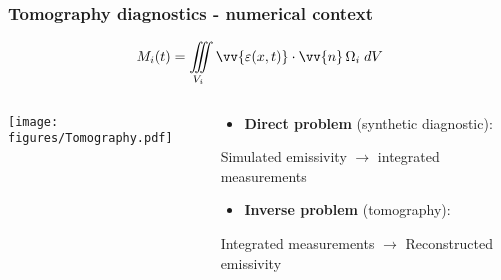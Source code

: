 \documentclass[10pt]{beamer}
\begin{document}
\begin{frame}
\frametitle{Tomography diagnostics - numerical context}
    \vspace{-0.75cm}

    $$M_i(t) = \iiint\limits_{V_i} \vv{\varepsilon(x,t)}\cdot\vv{n} \,\Omega_i \;{d}V$$
    \vspace{-0.75cm}
\begin{columns}
	\begin{column}{0.325\textwidth}

	\texttt{[image: figures/Tomography.pdf]}

	\end{column}

	\begin{column}{0.675\textwidth}
	\begin{center}

	\begin{block}{}
	\begin{itemize}
	\item \textcolor{myblue}{\textbf{Direct problem} (synthetic diagnostic):\\
	}
	\end{itemize}
	\end{block}
Simulated emissivity $\longrightarrow$ integrated measurements\\

	\begin{block}{}
	\begin{itemize}
	\item \textcolor{myblue}{\textbf{Inverse problem} (tomography):\\
	}
	\end{itemize}
	\end{block}
Integrated measurements $\longrightarrow$ Reconstructed emissivity \\

	\end{center}

	\end{column}
%
\end{columns}


\end{frame}
\end{document}
